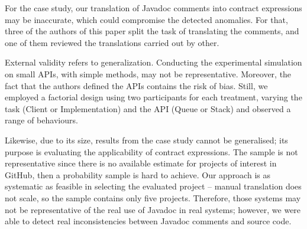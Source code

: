 For the case study, our translation of Javadoc comments into contract expressions may be inaccurate, which could compromise the detected anomalies. For that, three of the authors of this paper split the task of translating the comments, and one of them reviewed the translations carried out by other. 



External validity refers to generalization. 
Conducting the experimental simulation on small APIs, with simple methods, may not be representative. Moreover, the fact that the authors defined the APIs contains the risk of bias. Still, we employed a factorial design using two participants for each treatment, varying the task (Client or Implementation) and the API (Queue or Stack) and observed a range of behaviours. 

Likewise, due to its size, results from the case study cannot be generalised; its purpose is evaluating the applicability of contract expressions.
The sample is not representative since there is no available estimate for projects of interest in GitHub, then a probability sample is hard to achieve. 
Our approach is as systematic as feasible in selecting the evaluated project -- manual translation does not scale, so the sample contains only five projects.
Therefore, those systems may not be representative of the real use of Javadoc in real systems; however, we were able to detect real inconsistencies between Javadoc comments and source code.



